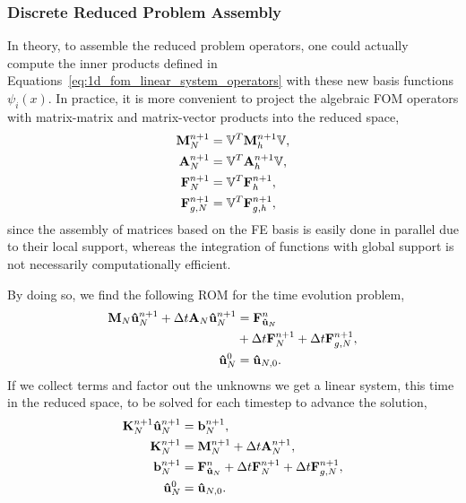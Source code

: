 \documentclass[../1_heat_equation.tex]{subfiles}
\newcommand{\rbV}{\ensuremath{\mathbb{V}}}
\newcommand{\rbVT}{\ensuremath{\rbV^T}}
\begin{document}
\subsubsection{Discrete Reduced Problem Assembly}
In theory, to assemble the reduced problem operators, one could actually compute the inner products defined in Equations~\eqref{eq:1d_fom_linear_system_operators} with these new basis functions $\psi_i(x)$.
In practice, it is more convenient to project the algebraic FOM operators with matrix-matrix and matrix-vector products into the reduced space, 
\begin{subequations}
    \label{eq:1d_rom_linear_system_operators}
    \begin{align}
        \vb{M}_{N}^{n+1} &= \rbVT \vb{M}_{h}^{n+1} \rbV, \\
        \vb{A}_{N}^{n+1} &= \rbVT \vb{A}_{h}^{n+1} \rbV, \\
        \vb{F}_{N}^{n+1} &= \rbVT \vb{F}_{h}^{n+1},  \\
        \vb{F}_{{g,N}}^{n+1} &= \rbVT \vb{F}_{{g,h}}^{n+1},
    \end{align}
\end{subequations}
since the assembly of matrices based on the FE basis is easily done in parallel due to their local support, 
whereas the integration of functions with global support is not necessarily computationally efficient.

By doing so, we find the following ROM for the time evolution problem,
\begin{subequations}
    \label{eq:1d_rom_weak_formulation_discrete}
    \begin{align}
        \vb{M}_N \vb{\hat{u}}_{N}^{n+1} + \Delta t \vb{A}_N \vb{\hat{u}}_{N}^{n+1} &= \vb{F}^{n}_{\vb{\hat{u}}_N} \\
        &+ \Delta t \vb{F}_N^{n+1} + \Delta t \vb{F}^{n+1}_{g, N}, \nonumber \\
        \vb{\hat{u}}_N^{0} &= \vb{\hat{u}}_{N,0}.
    \end{align}
\end{subequations}
If we collect terms and factor out the unknowns we get a linear system, this time in the reduced space, to be solved for each timestep to advance the solution,
\begin{subequations}
    \label{eq:1d_rom_linear_system_timestep}
    \begin{align}
        \vb{K}_N^{n+1} \vb{\hat{u}}_N^{n+1} &= \vb{b}_N^{n+1}, \\
        \vb{K}_N^{n+1} &= \vb{M}_{N}^{n+1} + \Delta t \vb{A}_{N}^{n+1}, \\
        \vb{b}_N^{n+1} &= \vb{F}_{\vb{\hat{u}}_N}^{n} + \Delta t \vb{F}_N^{n+1} + \Delta t \vb{F}_{g,N}^{n+1}, \\
        \vb{\hat{u}}_N^{0} &= \vb{\hat{u}}_{N,0}.
    \end{align}
\end{subequations}
\end{document}
